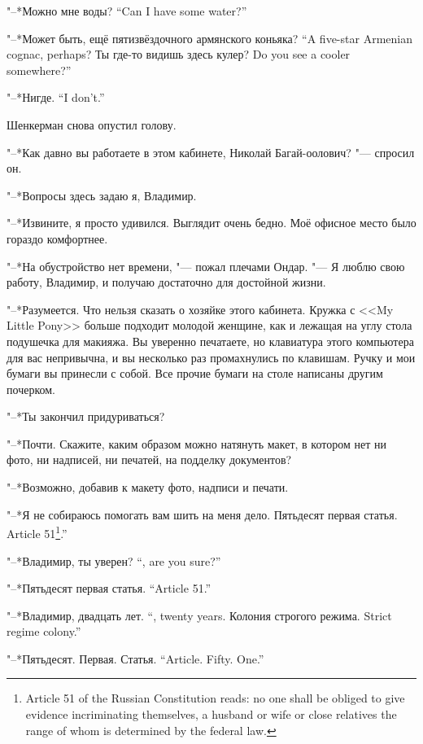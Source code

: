 {"--*Можно мне воды?}
{``Can I have some water?''}

{"--*Может быть, ещё пятизвёздочного армянского коньяка?}
{``A five-star Armenian cognac, perhaps?}
{Ты где-то видишь здесь кулер?}
{Do you see a cooler somewhere?''}

{"--*Нигде.}
{``I don't.''}

Шенкерман снова опустил голову.

"--*Как давно вы работаете в этом кабинете, Николай Багай-оолович? "--- спросил он.

"--*Вопросы здесь задаю я, Владимир.

"--*Извините, я просто удивился.
Выглядит очень бедно.
Моё офисное место было гораздо комфортнее.

"--*На обустройство нет времени, "--- пожал плечами Ондар.
"--- Я люблю свою работу, Владимир, и получаю достаточно для достойной жизни.

"--*Разумеется.
Что нельзя сказать о хозяйке этого кабинета.
Кружка с <<My Little Pony>> больше подходит молодой женщине, как и лежащая на углу стола подушечка для макияжа.
Вы уверенно печатаете, но клавиатура этого компьютера для вас непривычна, и вы несколько раз промахнулись по клавишам.
Ручку и мои бумаги вы принесли с собой.
Все прочие бумаги на столе написаны другим почерком.

"--*Ты закончил придуриваться?

"--*Почти.
Скажите, каким образом можно натянуть макет, в котором нет ни фото, ни надписей, ни печатей, на подделку документов?

"--*Возможно, добавив к макету фото, надписи и печати.

"--*Я не собираюсь помогать вам шить на меня дело.
{Пятьдесят первая статья.}
{Article 51\footnote{Article 51 of the Russian Constitution reads: no one shall be obliged to give evidence incriminating themselves, a husband or wife or close relatives the range of whom is determined by the federal law.}.''}

{"--*Владимир, ты уверен?}
{``\Vladimir, are you sure?''}

{"--*Пятьдесят первая статья.}
{``Article 51.''}

{"--*Владимир, двадцать лет.}
{``\Vladimir, twenty years.}
{Колония строгого режима.}
{Strict regime colony.''}

{"--*Пятьдесят. Первая. Статья.}
{``Article. Fifty. One.''}

